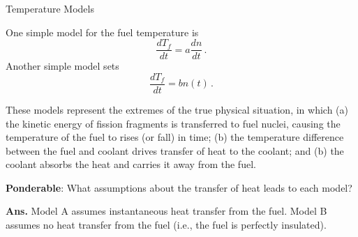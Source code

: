\documentclass[aspectratio=1610]{beamer}
\begin{document}
\begin{frame}[fragile]{Temperature Models}

One simple model for the fuel temperature is
\begin{equation*}
  \tag{Model A}
  \frac{d T_f}{dt} = a \frac{dn}{dt} \, .
\end{equation*}
Another simple model sets
\begin{equation*}
  \tag{Model B}
  \frac{d T_f}{dt} = b  n(t) \, .
\end{equation*}

These models represent the extremes of the true physical situation, in which (a) the kinetic energy of fission fragments is transferred to fuel nuclei, causing the temperature of the fuel to rises (or fall) in time;  (b) the temperature difference between the fuel and coolant drives transfer of heat to the coolant; and (b) the coolant absorbs the heat and carries it away from the fuel.

\vfill 

{\bf Ponderable}: What assumptions about the transfer of heat leads to each model?

{\small 
\textcolor{wcprimary}
{
 {\bf Ans.} Model A assumes instantaneous heat transfer from the fuel.  Model B assumes no heat transfer from the fuel (i.e., the fuel is perfectly insulated).
}
} 
\end{frame}
\end{document}
